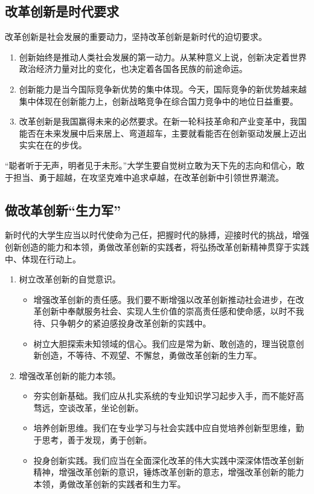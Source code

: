 \subsection{改革创新是时代要求}
改革创新是社会发展的重要动力，坚持改革创新是新时代的迫切要求。
\begin{enumerate}
\item 创新始终是推动人类社会发展的第一动力。从某种意义上说，创新决定着世界政治经济力量对比的变化，也决定着各国各民族的前途命运。
\item 创新能力是当今国际竞争新优势的集中体现。今天，国际竞争的新优势越来越集中体现在创新能力上，创新战略竞争在综合国力竞争中的地位日益重要。
\item 改革创新是我国赢得未来的必然要求。在新一轮科技革命和产业变革中，我国能否在未来发展中后来居上、弯道超车，主要就看能否在创新驱动发展上迈出实实在在的步伐。
\end{enumerate}

“聪者听于无声，明者见于未形。”大学生要自觉树立敢为天下先的志向和信心，敢于担当、勇于超越，在攻坚克难中追求卓越，在改革创新中引领世界潮流。

\subsection{做改革创新“生力军”}
新时代的大学生应当以时代使命为己任，把握时代的脉搏，迎接时代的挑战，增强创新创造的能力和本领，勇做改革创新的实践者，将弘扬改革创新精神贯穿于实践中、体现在行动上。
\begin{enumerate}
\item 树立改革创新的自觉意识。
\begin{itemize}
\item 增强改革创新的责任感。我们要不断增强以改革创新推动社会进步，在改革创新中奉献服务社会、实现人生价值的崇高责任感和使命感，以时不我待、只争朝夕的紧迫感投身改革创新的实践中。
\item 树立大胆探索未知领域的信心。我们应是常为新、敢创造的，理当锐意创新创造，不等待、不观望、不懈怠，勇做改革创新的生力军。
\end{itemize}
\item 增强改革创新的能力本领。
\begin{itemize}
\item 夯实创新基础。我们应从扎实系统的专业知识学习起步入手，而不能好高骛远，空谈改革，坐论创新。
\item 培养创新思维。我们在专业学习与社会实践中应自觉培养创新型思维，勤于思考，善于发现，勇于创新。
\item 投身创新实践。我们应当在全面深化改革的伟大实践中深深体悟改革创新精神，增强改革创新的意识，锤炼改革创新的意志，增强改革创新的能力本领，勇做改革创新的实践者和生力军。
\end{itemize}
\end{enumerate}

